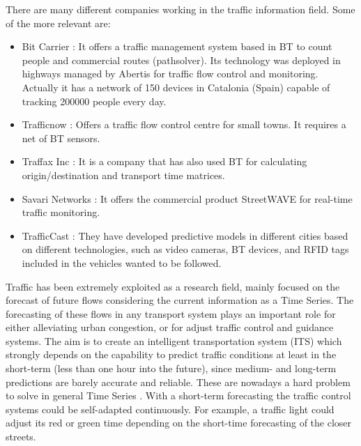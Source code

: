 \documentclass[preprint]{elsarticle}
\begin{document}
There are many different companies working in the traffic information
field. Some of the more relevant are: 

\begin{itemize}
\item Bit Carrier \cite{mendez2011system,BitCarrier}: It offers a traffic 
management system based in BT to count people and commercial routes 
(pathsolver). Its technology was deployed in highways managed by Abertis for 
traffic flow control and monitoring. Actually it has a network of 150 devices 
in Catalonia (Spain) capable of tracking 200000 people every day.
\item Trafficnow \cite{Trafficnow}: Offers a traffic flow control centre for 
small towns. It requires a net of BT sensors. %
\item Traffax Inc \cite{TraffaxInc}: It is a company that has also used 
BT for calculating origin/destination and transport time matrices.
\item Savari Networks \cite{SavariNetworks}: It offers the commercial 
product StreetWAVE for real-time traffic monitoring.
\item TrafficCast \cite{TrafficCast}: They have developed predictive models 
in different cities based on different technologies, such as video cameras, BT devices, and RFID tags included in the vehicles wanted to be followed.
\end{itemize}

Traffic has been extremely exploited as a research field, mainly focused on the forecast of future flows considering the current information as a Time Series.
The forecasting of these flows in any transport system plays an important role for either alleviating urban congestion, or for adjust traffic control and guidance systems. The aim is to create an intelligent transportation system (ITS) which strongly depends on the capability to predict traffic conditions at least in the short-term (less than one hour into the future), since medium- and long-term predictions are barely accurate and reliable. These are nowadays a hard problem to solve in general Time Series \cite{ParrasGutierrez2014433}.
With a short-term forecasting the traffic control systems could be self-adapted continuously. For example, a traffic light could adjust its red or green time depending on the short-time forecasting of the closer streets. 
\end{document}
